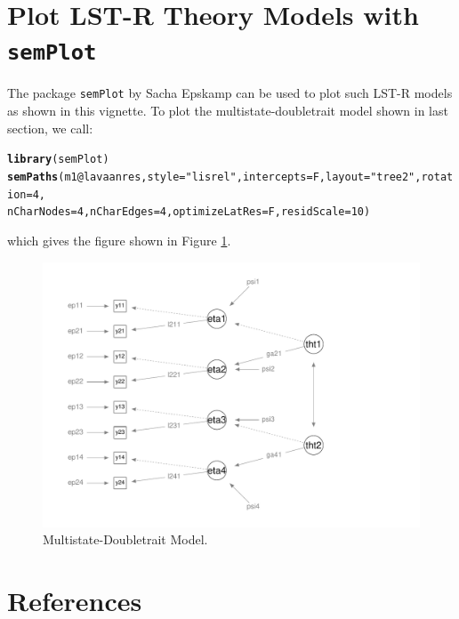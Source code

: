 \documentclass[10pt]{article}\usepackage{graphicx, color}
\makeatletter
\newcommand{\hlfunctioncall}[1]{\textcolor[rgb]{0.501960784313725,0,0.329411764705882}{\textbf{#1}}}%
\newcommand{\hlstring}[1]{\textcolor[rgb]{0.6,0.6,1}{#1}}%
\newenvironment{kframe}{%
 \def\at@end@of@kframe{}%
 \ifinner\ifhmode%
  \def\at@end@of@kframe{\end{minipage}}%
  \begin{minipage}{\columnwidth}%
 \fi\fi%
 \def\FrameCommand##1{\hskip\@totalleftmargin \hskip-\fboxsep
 \colorbox{shadecolor}{##1}\hskip-\fboxsep
     \hskip-\linewidth \hskip-\@totalleftmargin \hskip\columnwidth}%
 \MakeFramed {\advance\hsize-\width
   \@totalleftmargin\z@ \linewidth\hsize
   \@setminipage}}%
 {\par\unskip\endMakeFramed%
 \at@end@of@kframe}
\newenvironment{knitrout}{}{} %
\makeatother
\begin{document}
%

\newpage

\section{Plot LST-R Theory Models with \texttt{semPlot}}

The package \texttt{semPlot} by Sacha Epskamp can be used to plot such LST-R models as shown in this vignette. To plot the multistate-doubletrait model shown in last section, we call:

%
\begin{knitrout}
\color{fgcolor}\begin{kframe}
\begin{alltt}
\hlfunctioncall{library}(semPlot)
\hlfunctioncall{semPaths}(m1@lavaanres, style = \hlstring{"lisrel"}, intercepts = F, layout = \hlstring{"tree2"}, rotation = 4, 
    nCharNodes = 4, nCharEdges = 4, optimizeLatRes = F, residScale = 10)
\end{alltt}
\end{kframe}
\end{knitrout}

%

which gives the figure shown in Figure \ref{fig:semplot01}.

%
\begin{figure}
\centering
\includegraphics[scale=0.7]{semplot01}
\caption{Multistate-Doubletrait Model.}
\label{fig:semplot01}
\end{figure}
%           

\section*{References}
\end{document}
